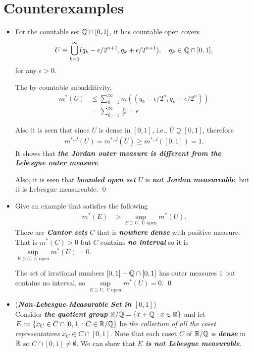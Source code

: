 \documentclass[11pt]{article}
\begin{document}
\newpage
\section{Counterexamples}
\begin{itemize}
\item \begin{example}
For the countable set ${\mathbb Q}\cap [0,1]$, it has countable open covers
\begin{align*}
U\equiv \bigcup_{k=1}^{\infty}(q_{k}-\epsilon/2^{n+1}, q_{k}+\epsilon/2^{n+1}), \quad q_{k}\in {\mathbb Q}\cap [0,1],
\end{align*}
for any $\epsilon>0$.

The by countable subadditivity, 
\begin{align*}
m^{*}(U) &\le \sum_{k=1}^{\infty}m((q_{k}-\epsilon/2^{n}, q_{k}+\epsilon/2^{n}))\\
&= \sum_{k=1}^{\infty}\frac{\epsilon}{2^{n}} = \epsilon
\end{align*}

Also it is seen that since $U$ is dense in $[0,1]$, i.e., $\overline{U}\supseteq [0,1]$, therefore
\begin{align*}
m^{*,J}(U)= m^{*,J}(\overline{U}) \ge m^{*,J}([0,1]) = 1.
\end{align*}
It shows that \emph{\textbf{the Jordan outer measure is different from the Lebesgue outer measure}}. 

Also, it is seen that \emph{\textbf{bounded open set}} $U$ is \emph{\textbf{not Jordan measureable}}, but it is Lebesgue measureable. \qed
\end{example}

\item \begin{example}Give an example that satisfies the following 
\begin{align*}
m^{*}(E) &> \sup\limits_{E\supset U, \;U\text{ open}}m^{*}(U). 
\end{align*}
There are \emph{\textbf{Cantor sets}} $C$ that is \emph{\textbf{nowhere dense}} with positive measure. That is $m^{*}(C)>0$ but $C$ contains \emph{\textbf{no interval}} so it is $\sup\limits_{E\supset U, \;U\text{ open}}m^{*}(U)=0$.  

The set of irrational numbers  $[0,1]- {\mathbb Q}\cap [0,1]$ has outer measures $1$ but contains no interval, so $\sup\limits_{E\supset U, \;U\text{ open}}m^{*}(U)=0$. \qed
\end{example}

\item \begin{example} (\emph{\textbf{Non-Lebesgue-Measurable Set in $[0,1]$}}) \\
Consider \emph{\textbf{the quotient group}} ${\mathbb R} / {\mathbb Q} = \left\{x + {\mathbb Q}: x \in {\mathbb R}\right\}$ and let $E := \left\{x_C \in C\cap [0,1]: C \in {\mathbb R} / {\mathbb Q}\right\}$ be \emph{the collection of all the coset representatives} $x_C \in C \cap [0,1]$. Note that each coset $C$ of ${\mathbb R} / {\mathbb Q}$ is \emph{\textbf{dense}} in ${\mathbb R}$ so $C \cap [0,1] \neq \emptyset$. We can show that \emph{\textbf{$E$ is not Lebesgue measurable}}.


\end{example}
\end{itemize}
\end{document}
